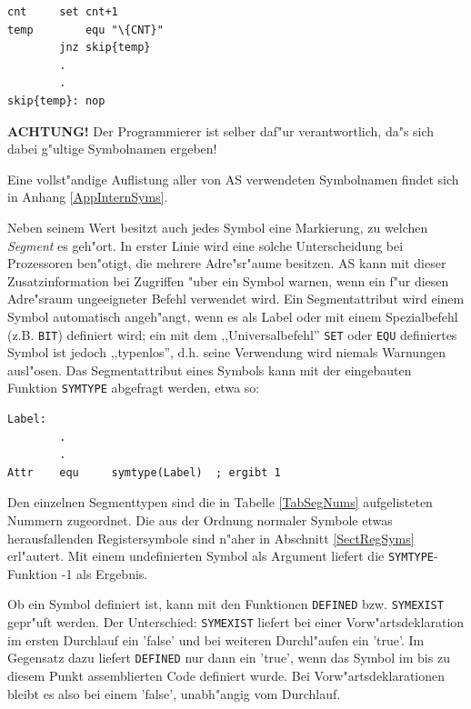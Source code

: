\documentclass[12pt,a4paper,twoside]{report}
\newcommand{\bb}[1]{{\bf #1}}
\newcommand{\tty}[1]{{\tt #1}}
\newcommand{\asname}{AS}
\begin{document}
\begin{verbatim}
cnt		set	cnt+1
temp		equ	"\{CNT}"
		jnz	skip{temp}
		.
		.
skip{temp}:	nop
\end{verbatim}
\bb{ACHTUNG!}  Der Programmierer ist selber daf"ur verantwortlich,
da"s sich dabei g"ultige Symbolnamen ergeben!
\par
Eine vollst"andige Auflistung aller von \asname{} verwendeten Symbolnamen
findet sich in Anhang \ref{AppInternSyms}.
\par
Neben seinem Wert besitzt auch jedes Symbol eine Markierung, zu welchen
{\em Segment} es geh"ort.  In erster Linie wird eine solche Unterscheidung
bei Prozessoren ben"otigt, die mehrere Adre"sr"aume besitzen.  \asname{} kann mit
dieser Zusatzinformation bei Zugriffen "uber ein Symbol warnen, wenn ein
f"ur diesen Adre"sraum ungeeigneter Befehl verwendet wird.  Ein
Segmentattribut wird einem Symbol automatisch angeh"angt, wenn es als Label
oder mit einem Spezialbefehl (z.B. \tty{BIT}) definiert wird; ein mit
dem ,,Universalbefehl'' \tty{SET} oder \tty{EQU} definiertes Symbol ist
jedoch ,,typenlos'', d.h. seine Verwendung wird niemals Warnungen
ausl"osen.  Das Segmentattribut eines Symbols kann mit der eingebauten
Funktion \tty{SYMTYPE} abgefragt werden, etwa so:
\begin{verbatim}
Label:
        .
        .
Attr    equ     symtype(Label)  ; ergibt 1
\end{verbatim}
Den einzelnen Segmenttypen sind die in Tabelle \ref{TabSegNums}
aufgelisteten Nummern zugeordnet.  Die aus der Ordnung normaler Symbole
etwas herausfallenden Registersymbole sind n"aher in Abschnitt
\ref{SectRegSyms} erl"autert.  Mit einem undefinierten Symbol als Argument
liefert die \tty{SYMTYPE}-Funktion -1 als Ergebnis.

Ob ein Symbol definiert ist, kann mit den Funktionen \tty{DEFINED} bzw.
\tty{SYMEXIST} gepr"uft werden.  Der Unterschied: \tty{SYMEXIST} liefert
bei einer Vorw"artsdeklaration im ersten Durchlauf ein 'false' und bei
weiteren Durchl"aufen ein 'true'.  Im Gegensatz dazu liefert \tty{DEFINED} nur
dann ein 'true', wenn das Symbol im bis zu diesem Punkt assemblierten Code
definiert wurde.  Bei Vorw"artsdeklarationen bleibt es also bei einem 'false',
unabh"angig vom Durchlauf.
\end{document}
